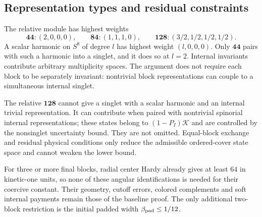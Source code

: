 \subsection{Representation types and residual constraints}
The relative module has highest weights
\begin{equation}
 \mathbf{44}:(2,0,0,0),\qquad
 \mathbf{84}:(1,1,1,0),\qquad
 \mathbf{128}:(3/2,1/2,1/2,1/2).
\end{equation}
A scalar harmonic on $S^8$ of degree $l$ has highest weight $(l,0,0,0)$. Only $\mathbf{44}$ pairs with such a harmonic into a singlet, and it does so at $l=2$. Internal invariants contribute arbitrary multiplicity spaces. The argument does not require each block to be separately invariant: nontrivial block representations can couple to a simultaneous internal singlet.

The relative $\mathbf{128}$ cannot give a singlet with a scalar harmonic and an internal trivial representation. It can contribute when paired with nontrivial spinorial internal representations; these states belong to $(1-P_I)\mathscr K$ and are controlled by the nonsinglet uncertainty bound. They are not omitted. Equal-block exchange and residual physical conditions only reduce the admissible ordered-cover state space and cannot weaken the lower bound.

For three or more final blocks, radial center Hardy already gives at least $64$ in kinetic-one units, so none of these angular identifications is needed for their coercive constant. Their geometry, cutoff errors, colored complements and soft internal payments remain those of the baseline proof. The only additional two-block restriction is the initial padded width $\beta_{\rm pad}\le1/12$.
